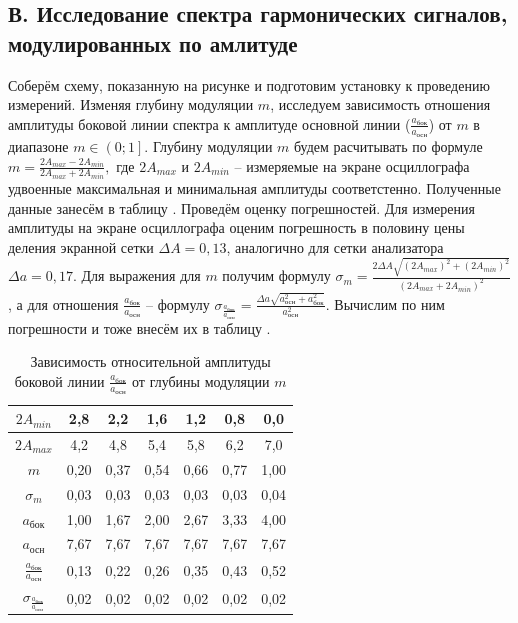 \documentclass[a4paper,10pt]{article}
\begin{document}
\subsection*{В. Исследование спектра гармонических сигналов, модулированных по амлитуде}

Соберём схему, показанную на рисунке  и подготовим установку к проведению измерений. Изменяя глубину модуляции $m$, исследуем зависимость отношения амплитуды боковой линии спектра к амплитуде основной линии ($\frac{a_{\text{бок}}}{a_{\text{осн}}}$) от $m$ в диапазоне $m\in\left(0;1\right]$. Глубину модуляции $m$ будем расчитывать по формуле $m=\frac{2A_{max}-2A_{min}}{2A_{max}+2A_{min}},$ где $2A_{max}$ и $2A_{min}$ -- измеряемые на экране осциллографа удвоенные максимальная и минимальная амплитуды соответстенно. Полученные данные занесём в таблицу . Проведём оценку погрешностей. Для измерения амплитуды на экране осциллографа оценим погрешность в половину цены деления экранной сетки $\Delta A=0,13$, аналогично для сетки анализатора $\Delta a=0,17$. Для выражения для $m$ получим формулу $\sigma_m=\frac{2\Delta A\sqrt{\left(2A_{max}\right)^2+\left(2A_{min}\right)^2}}{\left(2A_{max}+2A_{min}\right)^2}$, а для отношения $\frac{a_{\text{бок}}}{a_{\text{осн}}}$ -- формулу $\sigma_{\frac{a_{\text{бок}}}{a_{\text{осн}}}}=\frac{\Delta a\sqrt{a_{\text{осн}}^2+a_{\text{бок}}^2}}{a_{\text{осн}}^2}$. Вычислим по ним погрешности и тоже внесём их в таблицу .

\begin{table}[h]
	\centering
	\caption{Зависимость относительной амплитуды боковой линии $\frac{a_{\text{бок}}}{a_{\text{осн}}}$ от глубины модуляции $m$} \label{Table_C}
	\begin{tabular}{|c|c|c|c|c|c|c|}
		\hline
		$2A_{min}$ & 2,8 & 2,2 & 1,6 & 1,2 & 0,8 & 0,0 \\ \hline
		$2A_{max}$ & 4,2 & 4,8 & 5,4 & 5,8 & 6,2 & 7,0 \\ \hline
		$m$ & 0,20 & 0,37 & 0,54 & 0,66 & 0,77 & 1,00 \\ \hline
		$\sigma_m$ & 0,03 & 0,03 & 0,03 & 0,03 & 0,03 & 0,04 \\ \hline
		$a_{\text{бок}}$ & 1,00 & 1,67 & 2,00 & 2,67 & 3,33 & 4,00 \\ \hline
		$a_{\text{осн}}$ & 7,67 & 7,67 & 7,67 & 7,67 & 7,67 & 7,67 \\ \hline
		$\frac{a_{\text{бок}}}{a_{\text{осн}}}$ & 0,13 & 0,22 & 0,26 & 0,35 & 0,43 & 0,52 \\ \hline
		$\sigma_{\frac{a_{\text{бок}}}{a_{\text{осн}}}}$ & 0,02 & 0,02 & 0,02 & 0,02 & 0,02 & 0,02 \\ \hline
	\end{tabular}
\end{table}
\end{document}
